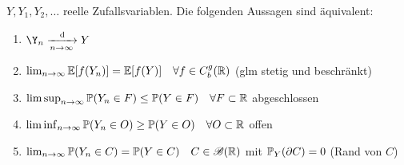 \begin{proposition}
	$Y,Y_1,Y_2, \dots$ reelle Zufallsvariablen. Die folgenden Aussagen sind äquivalent:
	\begin{enumerate}
		\item $\Y_n \konverteil Y$
		\item $\lim_{n \to \infty} \E[f(Y_n)] = \E[f(Y)] \quad \forall f \in C_b^g(\R)$ (glm stetig und beschränkt)
		\item $\limsup_{n \to \infty} \P(Y_n \in F) \le \P(Y \in F) \quad \forall F \subset \R$ abgeschlossen
		\item $\liminf_{n \to \infty} \P(Y_n \in O) \ge \P(Y \in O) \quad \forall O \subset \R$ offen
		\item $\lim_{n \to \infty} \P(Y_n \in C) = \P(Y \in C) \quad C \in \borel(\R)$ mit $\P_Y(\partial C) = 0$ (Rand von $C$)
	\end{enumerate}
\end{proposition}

